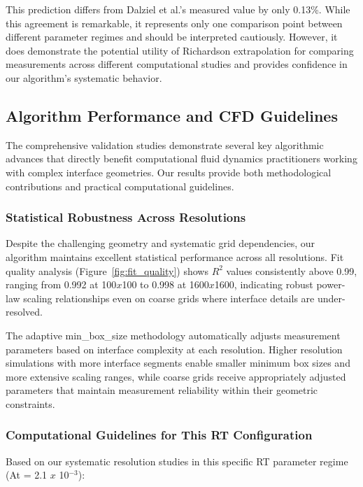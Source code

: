 \documentclass[preprint,12pt]{elsarticle}
\def\times{x}%
\begin{document}
This prediction differs from Dalziel et al.'s measured value by only 0.13\%. While this agreement is remarkable, it represents only one comparison point between different parameter regimes and should be interpreted cautiously. However, it does demonstrate the potential utility of Richardson extrapolation for comparing measurements across different computational studies and provides confidence in our algorithm's systematic behavior.

\subsection{Algorithm Performance and CFD Guidelines}
\label{subsec:practical_impact}

The comprehensive validation studies demonstrate several key algorithmic advances that directly benefit computational fluid dynamics practitioners working with complex interface geometries. Our results provide both methodological contributions and practical computational guidelines.

\subsubsection{Statistical Robustness Across Resolutions}

Despite the challenging geometry and systematic grid dependencies, our algorithm maintains excellent statistical performance across all resolutions. Fit quality analysis (Figure~\ref{fig:fit_quality}) shows $R^2$ values consistently above 0.99, ranging from 0.992 at 100$\times$100 to 0.998 at 1600$\times$1600, indicating robust power-law scaling relationships even on coarse grids where interface details are under-resolved.

The adaptive min\_box\_size methodology automatically adjusts measurement parameters based on interface complexity at each resolution. Higher resolution simulations with more interface segments enable smaller minimum box sizes and more extensive scaling ranges, while coarse grids receive appropriately adjusted parameters that maintain measurement reliability within their geometric constraints.

\subsubsection{Computational Guidelines for This RT Configuration}

Based on our systematic resolution studies in this specific RT parameter regime (At = 2.1 $\times$ 10$^{-3}$):
\end{document}

